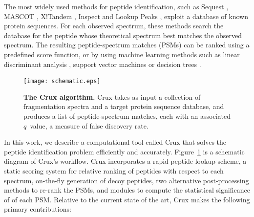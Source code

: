\documentclass[12pt]{article}
\begin{document}
The most widely used methods for peptide identification, such as
{\sc Sequest} \cite{eng:approach}, MASCOT \cite{perkins:probability},
X!Tandem \cite{craig:tandem}, Inspect \cite{tanner:inspect} and Lookup Peaks
\cite{bern:lookup}, 
exploit a database of known protein sequences.  For each observed
spectrum, these methods search the database for the peptide whose
theoretical spectrum best matches the observed spectrum.  The
resulting peptide-spectrum matches (PSMs) can be ranked using a
predefined score function, or by using machine learning methods such
as linear discriminant analysis \cite{keller:empirical}, support
vector machines \cite{anderson:new, kall:semi-supervised} or decision
trees \cite{elias:intensity}.

\begin{figure}
\centering
\texttt{[image: schematic.eps]}
\caption{{\bf The Crux algorithm.}  Crux takes as input a collection
  of fragmentation spectra and a target protein sequence database, and
  produces a list of peptide-spectrum matches, each with an associated
  $q$~value, a measure of false discovery rate. 
  \label{figure:crux}}
\end{figure}

In this work, we describe a computational tool called Crux that solves
the peptide identification problem efficiently and accurately.
Figure~\ref{figure:crux} is a schematic diagram of Crux's workflow.
Crux incorporates a rapid peptide lookup scheme, a static scoring
system for relative ranking of peptides with respect to each spectrum,
on-the-fly generation of decoy peptides, two alternative
post-processing methods to re-rank the PSMs, and modules to compute
the statistical significance of of each PSM.  Relative to the current
state of the art, Crux makes the following primary contributions:
\end{document}
